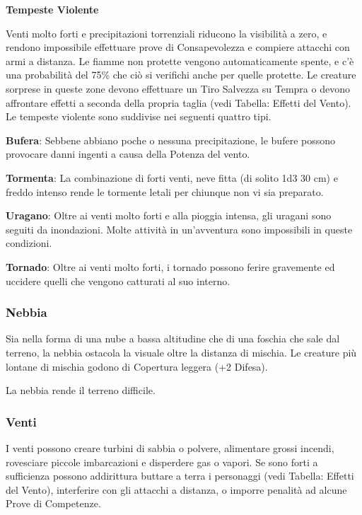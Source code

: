 \documentclass[a4paper,11pt,twoside,openany]{book}
\begin{document}
\textbf{Tempeste Violente}

Venti molto forti e precipitazioni torrenziali riducono la visibilità a zero, e rendono impossibile effettuare prove di Consapevolezza e compiere attacchi con armi a distanza. Le fiamme non protette vengono automaticamente spente, e c'è una probabilità del 75\% che ciò si verifichi anche per quelle protette. Le creature sorprese in queste zone devono effettuare un Tiro Salvezza su Tempra o devono affrontare effetti a seconda della propria taglia (vedi Tabella: Effetti del Vento). Le tempeste violente sono suddivise nei seguenti quattro tipi.

\textbf{Bufera}: Sebbene abbiano poche o nessuna precipitazione, le bufere possono provocare danni ingenti a causa della Potenza del vento.

\textbf{Tormenta}: La combinazione di forti venti, neve fitta (di solito 1d3 \texttimes{} 30 cm) e freddo intenso rende le tormente letali per chiunque non vi sia preparato.

\textbf{Uragano}: Oltre ai venti molto forti e alla pioggia intensa, gli uragani sono seguiti da inondazioni. Molte attività in un'avventura sono impossibili in queste condizioni.

\textbf{Tornado}: Oltre ai venti molto forti, i tornado possono ferire gravemente ed uccidere quelli che vengono catturati al suo interno.

\subsubsection{Nebbia}

\label{nebbia}

Sia nella forma di una nube a bassa altitudine che di una foschia che sale dal terreno, la nebbia ostacola la visuale oltre la distanza di mischia. Le creature più lontane di mischia godono di Copertura leggera (+2 Difesa).

La nebbia rende il terreno difficile.


\subsubsection{Venti}

\label{venti}

I venti possono creare turbini di sabbia o polvere, alimentare grossi incendi, rovesciare piccole imbarcazioni e disperdere gas o vapori. Se sono forti a sufficienza possono addirittura buttare a terra i personaggi (vedi Tabella: Effetti del Vento), interferire con gli attacchi a distanza, o imporre penalità ad alcune Prove di Competenze.
\end{document}
